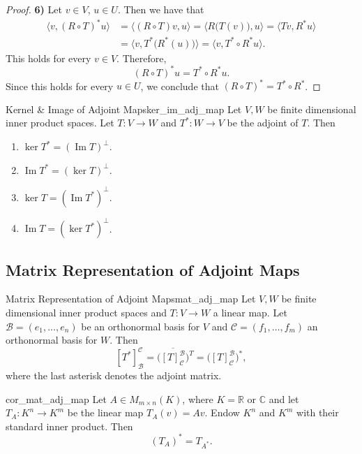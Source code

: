 \begin{proof}
	\textbf{6)} Let $v \in V$, $u \in U$. Then we have that
	\begin{align*}
		\langle v, (R \circ T)^* u\rangle &= \langle (R \circ T)v, u\rangle = \langle R\big(T(v)\big), u \rangle = \langle Tv, R^*u\rangle \\
		&= \langle v, T^*\big(R^*(u)\big) \rangle = \langle v, T^* \circ R^* u\rangle.
	\end{align*}
	This holds for every $v \in V$. Therefore, 
	\[
		(R \circ T)^*u = T^* \circ R^* u.
	\]
	Since this holds for every $u \in U$, we conclude that $(R \circ T)^* = T^* \circ R^*$. \qedhere
\end{proof}

\begin{lemma}{Kernel \& Image of Adjoint Maps}{ker_im_adj_map}
	Let $V, W$ be finite dimensional inner product spaces. Let $T:V \to W$ and $T^*:W \to V$ be the adjoint of $T$. Then
	\begin{enumerate}
		\item $\ker T^* = (\operatorname{Im}T)^{\perp}$.
		\item $\operatorname{Im}T^* = (\ker T)^{\perp}$.
		\item $\ker T = (\operatorname{Im}T^*)^{\perp}$.
		\item $\operatorname{Im}T = (\ker T^*)^{\perp}$.
	\end{enumerate}
\end{lemma}

\subsection{Matrix Representation of Adjoint Maps}
\begin{proposition}{Matrix Representation of Adjoint Maps}{mat_adj_map}
	Let $V, W$ be finite dimensional inner product spaces and $T:V \to W$ a linear map. Let $\mathcal{B} = (e_1, \hdots , e_n)$ be an orthonormal basis for $V$ and $\mathcal{C} = (f_1, \hdots, f_m)$ an orthonormal basis for $W$. Then
	\[
		[T^*]^{\mathcal{C}}_{\mathcal{B}} = \Big(\overline{[T]^{\mathcal{B}}_{\mathcal{C}}}\Big)^T = \Big([T]^{\mathcal{B}}_{\mathcal{C}}\Big)^*,
	\]
	where the last asterisk denotes the adjoint matrix.
\end{proposition}

\begin{corollary}{}{cor_mat_adj_map}
	Let $A \in M_{m \times n}(K)$, where $K = \mathbb{R}$ or $\mathbb{C}$ and let $T_A:K^n \to K^m$ be the linear map $T_A(v) = Av$. Endow $K^n$ and $K^m$ with their standard inner product. Then
	\[
		(T_A)^* = T_{A^*}.
	\]
\end{corollary}

